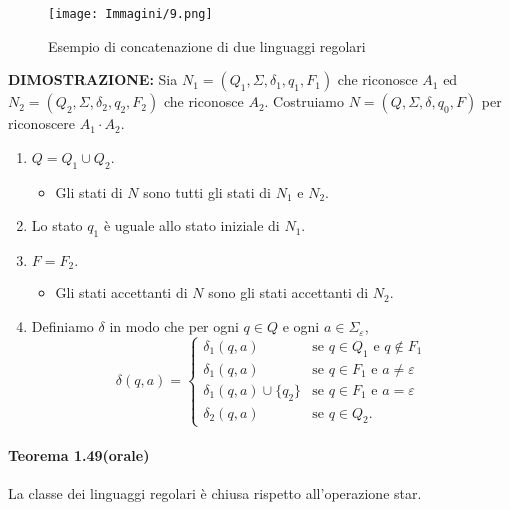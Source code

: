 \documentclass{article}
\begin{document}
\begin{figure}[H]
    \centering
    \texttt{[image: Immagini/9.png]}
    \caption{Esempio di concatenazione di due linguaggi regolari}
    \label{fig:concatenation_example1}
\end{figure}
\vspace{1em}

\textbf{DIMOSTRAZIONE:}
Sia $N_1 = (Q_1, \Sigma, \delta_1, q_1, F_1)$ che riconosce $A_1$ ed
$N_2 = (Q_2, \Sigma, \delta_2, q_2, F_2)$ che riconosce $A_2$.
Costruiamo $N = (Q, \Sigma, \delta, q_0, F)$ per riconoscere $A_1 \cdot A_2$.
\begin{enumerate}
    \item $Q = Q_1 \cup Q_2.$
        \begin{itemize}
            \item Gli stati di $N$ sono tutti gli stati di $N_1$ e $N_2$.
        \end{itemize}
    \item Lo stato $q_1$ è uguale allo stato iniziale di $N_1$.
    \item $F = F_2.$
        \begin{itemize}
            \item Gli stati accettanti di $N$ sono gli stati accettanti di $N_2$.
        \end{itemize}
    \item Definiamo $\delta$ in modo che per ogni $q \in Q$ e ogni $a \in \Sigma_\varepsilon$,
    \[
    \delta(q, a) =
    \begin{cases}
        \delta_1(q, a) & \text{se } q \in Q_1 \text{ e } q \notin F_1 \\
        \delta_1(q, a) & \text{se } q \in F_1 \text{ e } a \neq \varepsilon \\
        \delta_1(q, a) \cup \{q_2\} & \text{se } q \in F_1 \text{ e } a = \varepsilon \\
        \delta_2(q, a) & \text{se } q \in Q_2.
    \end{cases}
    \]
\end{enumerate}
\vspace{4em}

\paragraph{Teorema 1.49(orale)}
\text{  }
\begin{tcolorbox}[colback=orange!10!white, colframe=orange!50!black, title=Teorema 1.49 (orale)]
La classe dei linguaggi regolari è chiusa rispetto all'operazione star.
\end{tcolorbox}
\end{document}
